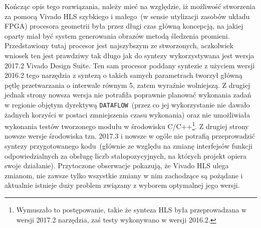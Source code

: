 Kończąc opis tego rozwiązania, należy mieć na względzie, iż możliwość stworzenia za pomocą Vivado HLS szybkiego i małego~(w sensie utylizacji zasobów układu FPGA) procesora geometrii była przez długi czas główną koncepcją, na jakiej oparty miał być system generowania obrazów metodą śledzenia promieni. Przedstawiony tutaj procesor jest najszybszym ze stworzonych, aczkolwiek wniosek ten jest prawdziwy tak długo jak do syntezy wykorzystywana jest wersja 2017.2 Vivado Design Suite. Ten sam procesor poddany syntezie z użyciem wersji 2016.2 tego narzędzia z syntezą o takich samych parametrach tworzył główną pętlę przetwarzania o interwale  równym 5, zatem wyraźnie wolniejszą. Z drugiej jednak strony nowsza wersja nie potrafiła poprawnie planować wykonania zadań w regionie objętym dyrektywą \texttt{DATAFLOW}~(przez co jej wykorzystanie nie dawało żadnych korzyści w postaci zmniejszenia czasu wykonania) oraz nie umożliwiała wykonania testów tworzonego modułu w środowisku C/C++\footnote{Wymuszało to postępowanie, takie że synteza HLS była przeprowadzana w wersji 2017.2 narzędzia, zaś testy wykonywano w wersji 2016.2.}. Z drugiej strony nowsze wersje środowiska tzn. 2017.3 i nowsze w ogóle nie potrafią przeprowadzić syntezy przygotowanego kodu~(głównie ze względu na zmianę interfejsów funkcji odpowiedzialnych za obsługę liczb stałopozycyjnych, na których projekt opiera swoje działanie). Przytoczone obserwacje pokazują, że Vivado HLS ulega zmianom, nie zawsze tylko wszystkie zmiany w nim zachodzące są pożądane i aktualnie istnieje duży problem związany z wyborem optymalnej jego wersji.

